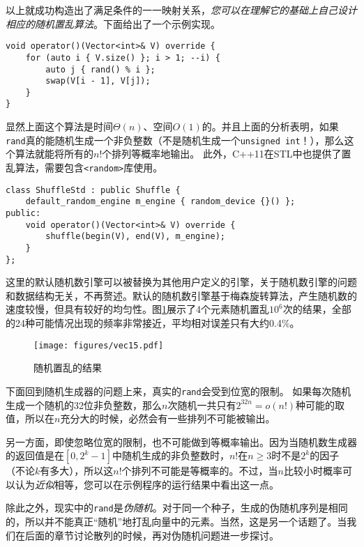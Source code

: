 以上就成功构造出了满足条件的一一映射关系，\textit{您可以在理解它的基础上自己设计相应的随机置乱算法}。下面给出了一个示例实现。

\begin{lstlisting}
void operator()(Vector<int>& V) override {
    for (auto i { V.size() }; i > 1; --i) {
        auto j { rand() % i };
        swap(V[i - 1], V[j]);
    }
}
\end{lstlisting}

显然上面这个算法是时间$\Theta(n)$、空间$O(1)$的。并且上面的分析表明，如果\lstinline{rand}真的能随机生成一个非负整数（不是随机生成一个\lstinline{unsigned int}！），那么这个算法就能将所有的$n!$个排列等概率地输出。
此外，C++11在STL中也提供了置乱算法，需要包含\lstinline{<random>}库使用。

\begin{lstlisting}
class ShuffleStd : public Shuffle {
    default_random_engine m_engine { random_device {}() };
public:
    void operator()(Vector<int>& V) override {
        shuffle(begin(V), end(V), m_engine);
    }
};
\end{lstlisting}

这里的默认随机数引擎可以被替换为其他用户定义的引擎，关于随机数引擎的问题和数据结构无关，不再赘述。默认的随机数引擎基于梅森旋转算法，产生随机数的速度较慢，但具有较好的均匀性。图\ref{fig:vec15}展示了4个元素随机置乱$10^6$次的结果，全部的24种可能情况出现的频率非常接近，平均相对误差只有大约0.4\%。

\begin{figure}
  \centering
  \texttt{[image: figures/vec15.pdf]}
  \caption{随机置乱的结果}
  \label{fig:vec15}
\end{figure}

下面回到随机生成器的问题上来，真实的\lstinline{rand}会受到位宽的限制。
如果每次随机生成一个随机的32位非负整数，那么$n$次随机一共只有$2^{32n}=o(n!)$种可能的取值，所以在$n$充分大的时候，必然会有一些排列不可能被输出。

另一方面，即使忽略位宽的限制，也不可能做到等概率输出。因为当随机数生成器的返回值是在$[0,2^k-1]$中随机生成的非负整数时，$n!$在$n\ge 3$时不是$2^k$的因子（不论$k$有多大），所以这$n!$个排列不可能是等概率的。不过，当$n$比较小时概率可以认为\textit{近似}相等，您可以在示例程序的运行结果中看出这一点。

除此之外，现实中的\lstinline{rand}是\textit{伪随机}。对于同一个种子，生成的伪随机序列是相同的，所以并不能真正“随机”地打乱向量中的元素。当然，这是另一个话题了。当我们在后面的章节讨论散列的时候，再对伪随机问题进一步探讨。

